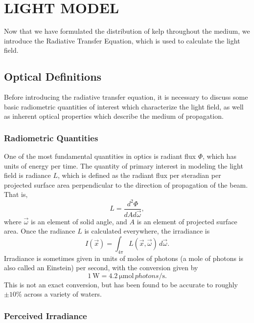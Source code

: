 \chapter{LIGHT MODEL}
\label{chap:light}

Now that we have formulated the distribution of kelp throughout the medium, we introduce the Radiative Transfer Equation, which is used to calculate the light field.

\section{Optical Definitions}
Before introducing the radiative transfer equation, it is necessary to discuss some basic radiometric quantities of interest which characterize the light field, as well as inherent optical properties which describe the medium of propagation.

\subsection{Radiometric Quantities}

One of the most fundamental quantities in optics is radiant flux $\Phi$, which has units of energy per time.
The quantity of primary interest in modeling the light field is radiance $L$, which is defined as the radiant flux per steradian per projected surface area perpendicular to the direction of propagation of the beam.
That is,
\begin{equation*}
	L = \frac{d^2\Phi}{dA d\vec{\omega}},
\end{equation*}
where $\vec{\omega}$ is an element of solid angle, and $A$ is an element of projected surface area.
Once the radiance $L$ is calculated everywhere, the irradiance is
\begin{equation*}
  I(\vec{x}) = \int_{4\pi}L(\vec{x},\vec{\omega})\, d\vec{\omega}.
\end{equation*}
Irradiance is sometimes given in units of moles of photons (a mole of photons is also called an Einstein) per second, with the conversion \cite{mobley_light_1994} given by
\begin{equation}
  \SI{1}{\W} = \SI{4.2}{\micro\mole \,photons\per\second}.
  \label{eqn:watts_photons}
\end{equation}
This is not an exact conversion, but has been found to be accurate to roughly $\pm10\%$ across a variety of waters.

\subsection{Perceived Irradiance}
\label{sec:perceived_irrad}

